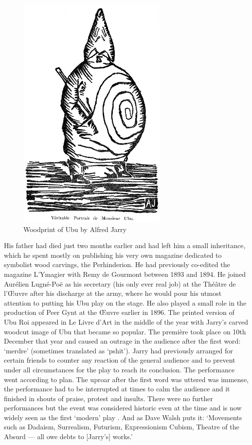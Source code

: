\begin{figure}[htb] %
  \centering
  \includegraphics[height=0.3\textheight]{images/ubu}
  \caption[Ubu]{Woodprint of Ubu by Alfred Jarry}
\label{fig:UBU}
\end{figure}

His father had died just two months earlier and had left him a small inheritance, which he spent mostly on publishing his very own magazine dedicated to symbolist wood carvings, the Perhinderion. He had previously co-edited the magazine L'Ymagier with Remy de Gourmont between 1893 and 1894. He joined Aurélien Lugné-Poë as his secretary (his only ever real job) at the Théâtre de l'Œuvre after his discharge at the army, where he would pour his utmost attention to putting his Ubu play on the stage. He also played a small role in the production of Peer Gynt at the Œuvre earlier in 1896. The printed version of Ubu Roi appeared in Le Livre d'Art in the middle of the year with Jarry's carved woodcut image of Ubu that became so popular. The première took place on 10th December that year and caused an outrage in the audience after the first word: `merdre' (sometimes translated as `pshit'). Jarry had previously arranged for certain friends to counter any reaction of the general audience and to prevent under all circumstances for the play to reach its conclusion. The performance went according to plan. The uproar after the first word was uttered was immense, the performance had to be interrupted at times to calm the audience and it finished in shouts of praise, protest and insults. There were no further performances but the event was considered historic even at the time and is now widely seen as the first `modern' play \autocite[p.168-169]{Brotchie2011}. And as Dave Walsh puts it: `Movements such as Dadaism, Surrealism, Futurism, Expressionism Cubism, Theatre of the Absurd --- all owe debts to [Jarry\rq s] works.' \autocite{Walsh2001}


